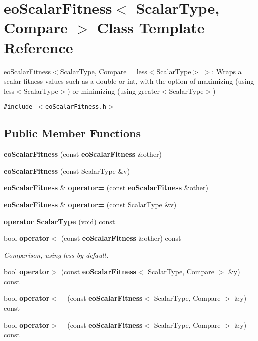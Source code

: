 \section{eo\-Scalar\-Fitness$<$ Scalar\-Type, Compare $>$ Class Template Reference}
\label{classeo_scalar_fitness}
eo\-Scalar\-Fitness$<$Scalar\-Type, Compare = less$<$Scalar\-Type$>$ $>$: Wraps a scalar fitness values such as a double or int, with the option of maximizing (using less$<$Scalar\-Type$>$) or minimizing (using greater$<$Scalar\-Type$>$)  


{\tt \#include $<$eo\-Scalar\-Fitness.h$>$}

\subsection*{Public Member Functions}
\begin{CompactItemize}
\item 
{\bf eo\-Scalar\-Fitness} (const {\bf eo\-Scalar\-Fitness} \&other)\label{classeo_scalar_fitness_a1}

\item 
{\bf eo\-Scalar\-Fitness} (const Scalar\-Type \&v)\label{classeo_scalar_fitness_a2}

\item 
{\bf eo\-Scalar\-Fitness} \& {\bf operator=} (const {\bf eo\-Scalar\-Fitness} \&other)\label{classeo_scalar_fitness_a3}

\item 
{\bf eo\-Scalar\-Fitness} \& {\bf operator=} (const Scalar\-Type \&v)\label{classeo_scalar_fitness_a4}

\item 
{\bf operator Scalar\-Type} (void) const \label{classeo_scalar_fitness_a5}

\item 
bool {\bf operator$<$} (const {\bf eo\-Scalar\-Fitness} \&other) const \label{classeo_scalar_fitness_a6}

\begin{CompactList}\small\item\em Comparison, using less by default. \item\end{CompactList}\item 
bool {\bf operator$>$} (const {\bf eo\-Scalar\-Fitness}$<$ Scalar\-Type, Compare $>$ \&y) const \label{classeo_scalar_fitness_a7}

\item 
bool {\bf operator$<$=} (const {\bf eo\-Scalar\-Fitness}$<$ Scalar\-Type, Compare $>$ \&y) const \label{classeo_scalar_fitness_a8}

\item 
bool {\bf operator$>$=} (const {\bf eo\-Scalar\-Fitness}$<$ Scalar\-Type, Compare $>$ \&y) const \label{classeo_scalar_fitness_a9}

\end{CompactItemize}
